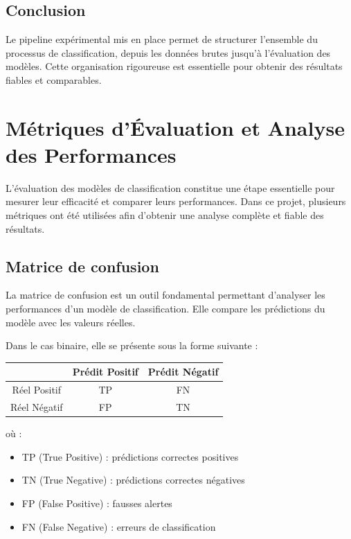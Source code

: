 \documentclass[12pt,a4paper]{article}
\begin{document}
    \subsection{Conclusion}

    Le pipeline expérimental mis en place permet de structurer l’ensemble du processus de classification, depuis les données brutes jusqu’à l’évaluation des modèles.
    Cette organisation rigoureuse est essentielle pour obtenir des résultats fiables et comparables.

    \section{Métriques d’Évaluation et Analyse des Performances}

    L’évaluation des modèles de classification constitue une étape essentielle pour mesurer leur efficacité et comparer leurs performances.
    Dans ce projet, plusieurs métriques ont été utilisées afin d’obtenir une analyse complète et fiable des résultats.

    \subsection{Matrice de confusion}

    La matrice de confusion est un outil fondamental permettant d’analyser les performances d’un modèle de classification.
    Elle compare les prédictions du modèle avec les valeurs réelles.

    Dans le cas binaire, elle se présente sous la forme suivante :

    \begin{center}
    \begin{tabular}{c|c|c}
    & Prédit Positif & Prédit Négatif \\
    \hline
    Réel Positif & TP & FN \\
    \hline
    Réel Négatif & FP & TN \\
    \end{tabular}
    \end{center}

    où :
    \begin{itemize}
        \item TP (True Positive) : prédictions correctes positives
        \item TN (True Negative) : prédictions correctes négatives
        \item FP (False Positive) : fausses alertes
        \item FN (False Negative) : erreurs de classification
    \end{itemize}
\end{document}
